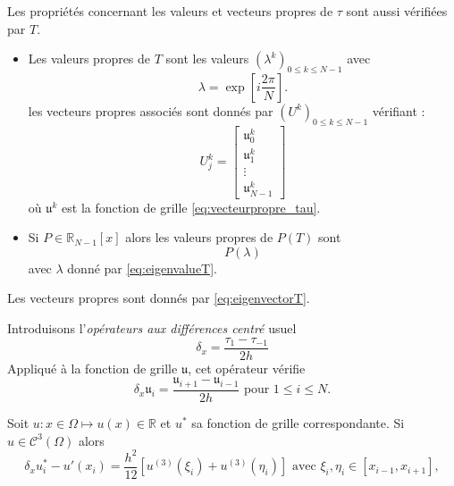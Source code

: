 Les propriétés concernant les valeurs et vecteurs propres de $\tau$ sont aussi vérifiées par $T$.

\begin{proposition}
\begin{itemize}
\item Les valeurs propres de $T$ sont les valeurs $(\lambda^k)_{0 \leq k \leq N-1}$ avec 
\begin{equation}
\lambda = \exp \left[ i \dfrac{2 \pi}{N} \right].
\label{eq:eigenvalueT}
\end{equation}
les vecteurs propres associés sont donnés par $\left( U^k \right)_{0 \leq k \leq N-1}$ vérifiant :
\begin{equation}
U^k_j = \begin{bmatrix}
\mathfrak{u}_0^k\\
\mathfrak{u}_1^k\\
\vdots \\
\mathfrak{u}_{N-1}^k
\end{bmatrix}
\label{eq:eigenvectorT}
\end{equation}
où $\mathfrak{u}^k$ est la fonction de grille \eqref{eq:vecteurpropre_tau}.

\item Si $P \in \mathbb{R}_{N-1}[x]$ alors les valeurs propres de $P(T)$ sont 
\begin{equation}
P(\lambda)
\end{equation}
avec $\lambda$ donné par \eqref{eq:eigenvalueT}.
\end{itemize}
Les vecteurs propres sont donnés par \eqref{eq:eigenvectorT}.
\end{proposition}









Introduisons l'\textit{opérateurs aux différences centré} usuel
\begin{equation}
\delta_x = \dfrac{\tau_1 - \tau_{-1}}{2h}
\end{equation}
Appliqué à la fonction de grille $\mathfrak{u}$, cet opérateur vérifie 
\begin{equation}
\delta_x \mathfrak{u}_i = \dfrac{\mathfrak{u}_{i+1} - \mathfrak{u}_{i-1}}{2h} \text{ pour } 1 \leq i \leq N.
\end{equation}

\begin{proposition}
Soit $u: x \in \Omega \mapsto u(x) \in \mathbb{R}$ et $u^*$ sa fonction de grille correspondante. Si $u \in \mathcal{C}^3 (\Omega)$ alors 
\begin{equation}
\delta_x u^*_i - u'(x_i) = \dfrac{h^2}{12} \left[ u^{(3)}(\xi_i) + u^{(3)}(\eta_i) \right]  \text{ avec } \xi_i , \eta_i \in [x_{i-1}, x_{i+1}],
\end{equation}
\end{proposition}


